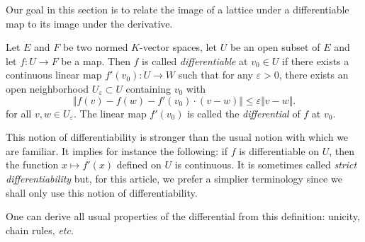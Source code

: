 \documentclass{lms}
\begin{document}
Our goal in this section is to relate the image of a lattice under a 
differentiable map to its image under the derivative.

\begin{deftn} \label{deftn : diff}
Let $E$ and $F$ be two normed $K$-vector spaces, let $U$ be an open 
subset of $E$ and let $f : U \rightarrow F$ be a map. Then $f$ is called 
\emph{differentiable} at $v_0 \in U$ if there exists a continuous linear 
map $f'(v_0) : U \rightarrow W$ such that for any $\varepsilon >0$, 
there exists an open neighborhood $U_\varepsilon \subset U$ containing 
$v_0$ with
\[ 
\Vert f(v)-f(w)-f'(v_0) \cdot \left( v-w \right) \Vert 
\leq \varepsilon \Vert v-w \Vert. 
\]
for all $v, w \in U_\varepsilon$.  The linear map $f'(v_0)$ is called the \emph{differential} of $f$ at $v_0$.
\end{deftn}

\begin{rem}
This notion of differentiability is stronger than the usual notion with 
which we are familiar. It implies for instance the following: if $f$ is 
differentiable on $U$, then the function $x \mapsto f'(x)$ defined on 
$U$ is continuous. 
It is sometimes called \emph{strict differentiability} but, for this
article, we prefer a simplier terminology since we shall only use this
notion of differentiability.
\end{rem}

One can derive all usual properties of the differential from this 
definition: unicity, chain rules, \emph{etc}.
\end{document}
